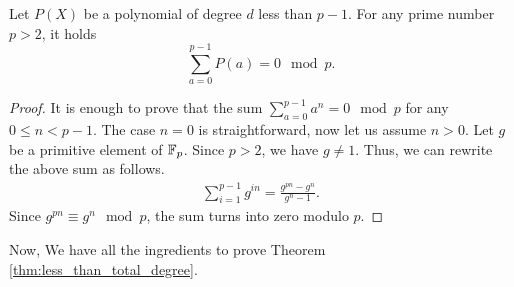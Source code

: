   \begin{lemma}\label{lem:sum_poly}
    Let $P(X)$ be a polynomial of degree $d$ less than $p-1$.
    For any prime number $p > 2$, it holds
    \[
      \sum_{a=0}^{p-1} P(a) = 0 \mod p.
    \]
  \end{lemma}
  \begin{proof}
    It is enough to prove that the sum $\sum_{a=0}^{p-1} a^n = 0 \mod p$ for any $0 \leq n < p-1$. The case $n=0$ is straightforward, now let us assume $n>0$. Let $g$ be a primitive element of $\mathbb{F}_p$.
    Since $p > 2$, we have $g \ne 1$.
    Thus, we can rewrite the above sum as follows.
    \begin{align}
      \sum_{i=1}^{p-1} g^{in} = \frac{g^{pn} - g^n}{g^n - 1}.
    \end{align}
    Since $g^{pn} \equiv g^n \mod p$, the sum turns into zero modulo $p$.
  \end{proof}
  Now, We have all the ingredients to prove Theorem \ref{thm:less_than_total_degree}.
